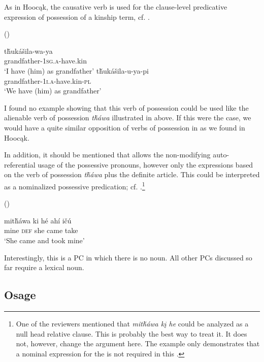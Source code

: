 \documentclass[output=paper]{LSP/langsci}
\begin{document}
As in Hoocąk, the causative verb is used for the clause-level predicative expression of possession of a kinship term, cf. .

\ea {} (\citealt[102]{Buechel1939}) \label{lakotahavegrandfather}

\ea \gll t\v{h}ukášila-wa-ya \\
grandfather-\textsc{1sg.a}-have.kin \\
\trans `I have (him) as grandfather'
\ex \gll t\v{h}ukášila-u-ya-pi \\
grandfather-\textsc{1i.a}-have.kin-\textsc{pl} \\
\glt `We have (him) as grandfather'
\z \z

I found no example showing that this verb of possession could be used like the alienable verb of possession \textit{t\v{h}\'awa} illustrated in  above. If this were the case, we would have a quite similar opposition of verbs of possession in  as we found in Hoocąk. 

In addition, it should be mentioned that  allows the non-modifying auto-referential usage of the possessive pronouns, however only the expressions based on the verb of possession \textit{t\v{h}\'awa} plus the definite article. This could be interpreted as a nominalized possessive predication; cf. .\footnote{One of the reviewers mentioned that \textit{mit\v{h}áwa kį he} could be analyzed as a null head relative clause. This is probably the best way to treat it. It does not, however, change the argument here. The example only demonstrates that a nominal expression for the  is not required in this .}

\ea	{} (\citealt[22]{Buechel1939}) \label{lakotatookmine}

\gll mit\v{h}áwa ki      h\'e   ahí     i\v{c}ú \\
mine        \textsc{def} she came take \\
\glt `She came and took mine'
\z

Interestingly, this is a PC in which there is no  noun. All other PCs discussed so far require a  lexical noun.
 
\subsection{Osage}\label{sec:helmbrecht:4.5} \label{osage}
\end{document}
